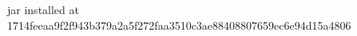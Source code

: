 \begin{shellbox}\begin{ttlst}
jar installed at 1714feeaa9f2f943b379a2a5f272faa3510c3ae88408807659ec6e94d15a4806
\end{ttlst}\end{shellbox}
